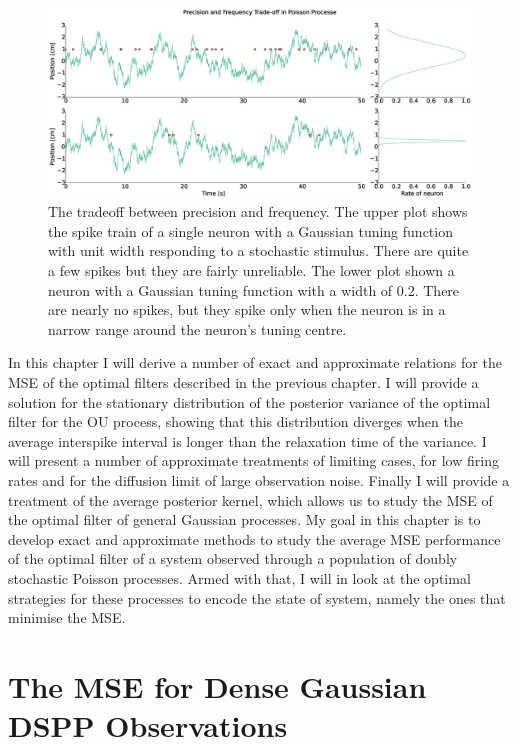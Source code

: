\begin{figure}
\includegraphics[width=\columnwidth]{figures/figure_3_example.eps}
\caption[Trading off precision and frequency in spike observations.]{The tradeoff between precision and frequency. The upper plot shows the spike train of a single neuron with a Gaussian tuning function with unit width responding to a
stochastic stimulus. There are quite a few spikes but they are fairly unreliable. The lower plot shown a neuron with a Gaussian tuning function with a width of $0.2$. There are
nearly no spikes, but they spike only when the neuron is in a narrow range around the neuron's tuning centre.}
\label{fig:neuron_example}
\end{figure}

In this chapter I will derive a number of exact and approximate relations for the MSE of the optimal filters described in the previous chapter. I will provide a solution for the stationary distribution of the
posterior variance of the optimal filter for the OU process, showing that this distribution diverges when the average interspike interval is longer than the relaxation time of the variance. I will present a 
number of approximate treatments of limiting cases, for low firing rates and for the diffusion limit of large observation noise. Finally I will provide a treatment of the average posterior
kernel, which allows us to study the MSE of the optimal filter of general Gaussian processes. My goal in this chapter is to develop exact and approximate methods to study the average
MSE performance of the optimal filter of a system observed through a population of doubly stochastic Poisson processes. Armed with that, I will in  look at the
optimal strategies for these processes to encode the state of system, namely the ones that minimise the MSE.

\section{The MSE for Dense Gaussian DSPP Observations}

